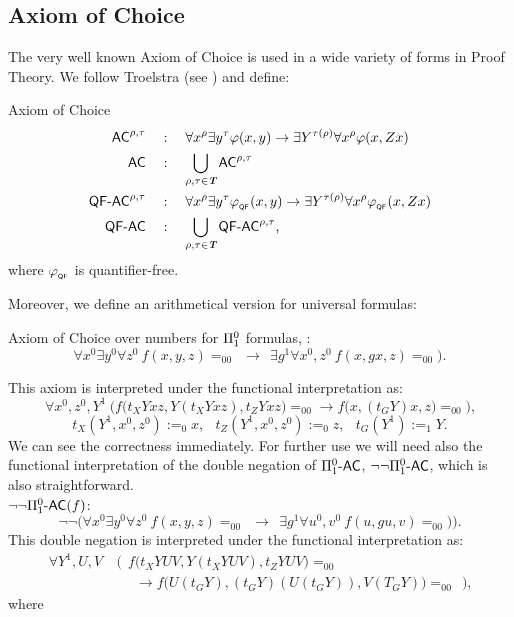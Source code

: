 \subsection{Axiom of Choice} \label{ss:AC}
The very well known Axiom of Choice is used in a wide variety of forms
in Proof Theory. We follow Troelstra (see \cite{Troelstra73}) and define:
\begin{dfn}{Axiom of Choice\\}
\begin{align*}
\textsf{\upshape AC}^{\rho,\tau}\quad&:\quad \forall x^\rho\exists y^\tau 
  \varphi(x,y)\rightarrow\exists Y^{\tau(\rho)}\forall x^\rho\varphi(x,Zx)\\
\textsf{\upshape AC}\quad&:\quad \bigcup_{\rho,\tau\in\emph{\protect\textbf{T}}}\textsf{\upshape AC}^{\rho,\tau}\\
\textsf{\upshape QF-}\textsf{\upshape AC}^{\rho,\tau}\quad&:\quad \forall x^\rho\exists y^\tau 
  \varphi_{{}_{\textsf{\upshape QF}}}(x,y)\rightarrow\exists Y^{\tau(\rho)}\forall x^\rho\varphi_{{}_{\textsf{\upshape QF}}}(x,Zx)\\
\textsf{\upshape QF-}\textsf{\upshape AC}\quad&:\quad \bigcup_{\rho,\tau\in\emph{\protect\textbf{T}}}\textsf{\upshape QF-}\textsf{\upshape AC}^{\rho,\tau}\text{,}
\end{align*}
where $\varphi_{{}_{\textsf{\upshape QF}}}$ is quantifier-free.
\end{dfn}
Moreover, we define an arithmetical version for universal formulas:
\begin{dfn}
Axiom of Choice over numbers for $\Pi^0_1$ formulas, :
\[ \forall x^0\exists y^0\forall z^0\ 
      f(x,y,z)=_00\ \ \rightarrow\ \ \exists g^1\forall x^0, z^0\ f(x,gx,z)=_00)  
\text{.}\]
\end{dfn}
This axiom is interpreted under the functional interpretation as:
  \[ \forall x^0,z^0,Y^1\ \Big(f\big(t_XYxz,Y(t_XYxz),t_ZYxz\big)=_00\rightarrow f\big(x,(t_GY)x,z\big)=_00\Big)  \text{,}
  \]
  \[  t_X(Y^1,x^0,z^0):=_0 x\text{,}\ \ \ \
      t_Z(Y^1,x^0,z^0):=_0 z\text{,}\ \ \ \  
      t_G(Y^1):=_1 Y
  \text{.}\]
We can see the correctness immediately. For further use we will need also the 
functional interpretation of the double negation of {$\Pi^0_1\textsf{\upshape -}\textsf{\upshape AC}$}, {$\neg\neg\Pi^0_1\textsf{\upshape -}\textsf{\upshape AC}$}, 
which is also straightforward.\\
$\neg\neg\Pi^0_1\textsf{\upshape -}\textsf{\upshape AC}(f)$:
\[ \neg\neg\big(\forall x^0\exists y^0\forall z^0\ f(x,y,z)=_00\ \ \rightarrow\ \ 
        \exists g^1\forall u^0, v^0\ f(u,gu,v)=_00)\big)
\text{.}\]
This double negation is interpreted under the functional interpretation as:
  \begin{align*}
    \forall Y^1,U,V\ &{\Big(}\ \ f\big(t_XYUV,Y(t_XYUV),t_ZYUV\big)=_00 \\
    {}               &{}\ \ \ \ \ \ \rightarrow f\big(U(t_GY),(t_GY)(U(t_GY)),V(T_GY)\big)=_00\ \ \Big)
     \text{,}
  \end{align*} where

